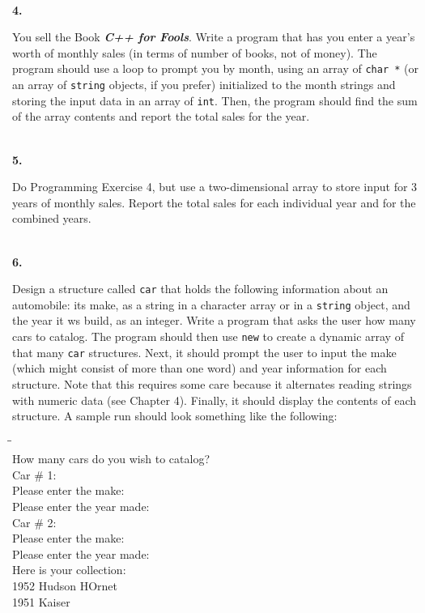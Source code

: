 \documentclass[10 pt]{amsart}
\newlength{\cwidth}
\newenvironment{cpart}[2][\cwidth]
	{\\ \phantom{\qquad}\textbf{#2. }\begin{minipage}[t]{#1}}
	{\end{minipage}}
\newcommand{\ttt}[1]{\texttt{#1}}
\newcommand{\ttb}[1]{\pmb{\texttt{#1}}}
\begin{document}
	\begin{cpart}{4}
		You sell the Book {\bf \emph{C++ for Fools}}. 
		Write a program that has you enter a year's worth of monthly
		sales (in terms of number of books, not of money).
		The program should use a loop to prompt you by month, using an 
		array of \verb+char *+ (or an array of \ttt{string} objects,
		if you prefer) initialized to the month strings and storing
		the input data in an array of \ttt{int}.
		Then, the program should find the sum of the array contents and
		report the total sales for the year.
	\end{cpart}
	\vspace{2ex}

	\begin{cpart}{5}
		Do Programming Exercise 4, but use a two-dimensional array to 
		store input for 3 years of monthly sales.
		Report the total sales for each individual year and for
		the combined years.
	\end{cpart}
	\vspace{2ex}

	\begin{cpart}{6}
		Design a structure called \ttt{car} that holds the following
		information about an automobile:
		its make, as a string in a character array or in a \ttt{string}
		object, and the year it ws build, as an integer.
		Write a program that asks the user how many cars to catalog.
		The program should then use \ttt{new} to create a dynamic array
		of that many \ttt{car} structures.
		Next, it should prompt the user to input the make (which 
		might consist of more than one word) and year information for
		each structure.
		Note that this requires some care because it alternates reading
		strings with numeric data (see Chapter 4).
		Finally, it should display the contents of each structure.
		A sample run should look something like the following:
		{\ttfamily
			\begin{tabbing}
				\phantom{\qquad}\=\phantom{\qquad}\=\phantom{\qquad}\= \\
				How many cars do you wish to catalog?\ttb{ 2} \\
				Car \# 1: \\
				Please enter the make:\ttb{ Hudson Hornet} \\
				Please enter the year made:\ttb{ 1952} \\
				Car \# 2: \\
				Please enter the make:\ttb{ Kaiser} \\
				Please enter the year made:\ttb{ 1951} \\
				Here is your collection: \\
				1952 Hudson HOrnet \\
				1951 Kaiser
			\end{tabbing}
		}
	\end{cpart}
	\vspace{2ex}
\end{document}
